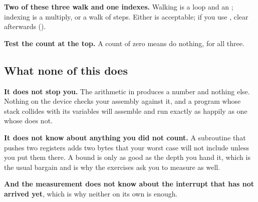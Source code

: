 \textbf{Two of these three walk and one indexes.} Walking is a loop and an ; indexing is
a multiply, or a walk of  steps. Either is acceptable; if you use , clear
 afterwards ().

\textbf{Test the count at the top.} A count of zero means do nothing, for all three.

\subsection{What none of this does}
\label{c4:sec:notdo}
\textbf{It does not stop you.} The arithmetic in  produces a number and
nothing else. Nothing on the device checks your assembly against it, and a program whose stack
collides with its variables will assemble and run exactly as happily as one whose does not.

\textbf{It does not know about anything you did not count.} A subroutine that pushes two registers
adds two bytes that your worst case will not include unless you put them there. A bound is only as
good as the depth you hand it, which is the usual bargain and is why the exercises ask you to
measure as well.

\textbf{And the measurement does not know about the interrupt that has not arrived yet}, which is
why neither on its own is enough.
